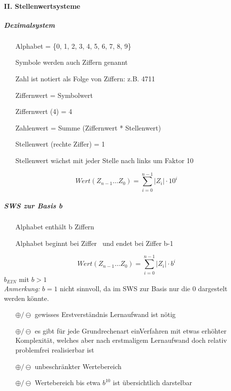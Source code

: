 \documentclass[10pt,a4paper]{scrartcl}
\begin{document}
	\paragraph{II. Stellenwertsysteme}
	\subparagraph{Dezimalsystem}
	\begin{itemize}
		\item[] Alphabet = \{0, 1, 2, 3, 4, 5, 6, 7, 8, 9\}
		\item[] Symbole werden auch Ziffern genannt
		\item[] Zahl ist notiert als Folge von Ziffern: z.B. 4711
		\item[] Ziffernwert = Symbolwert
		\item[] Ziffernwert (4) = 4
		\item[] Zahlenwert = Summe (Ziffernwert * Stellenwert) 
		\item[] Stellenwert (rechte Ziffer) = 1  
		\item[]Stellenwert wächst mit jeder Stelle nach links um Faktor 10
	\end{itemize}
	$$
	Wert(Z_{n-1} \dots Z_0) = \sum_{i=0}^{n-1}|Z_i|\cdot10^i
	$$
	\subparagraph{SWS zur Basis b}
	\begin{itemize}
		\item[] Alphabet enthält b Ziffern
		\item[] Alphabet beginnt bei Ziffer \grqq\ und endet bei Ziffer \glqq b-1\grqq\
	\end{itemize} 
	$$
		Wert(Z_{n-1} \dots Z_0) = \sum_{i=0}^{n-1}|Z_i| \cdot b^i
	$$
	$b_{EIN}$ mit $b>1$\\
	\textit{Anmerkung:} $b=1$ nicht sinnvoll, da im SWS zur Basis nur die 0 dargestelt werden könnte.
	\begin{itemize}
		\item[$ \oplus/\ominus $] gewisses \glqq Erstverständnis \grqq\/Lernaufwand ist nötig
		\item[$ \oplus/\ominus $] es gibt für jede Grundrechenart einVerfahren mit etwas erhöhter Komplexität, welches aber nach erstmaligem Lernaufwand doch relativ problemfrei realisierbar ist
		\item[$ \oplus/\ominus $] unbeschränkter Wertebereich
		\item[$ \oplus/\ominus $] Wertebereich bis etwa $b^10$ ist übersichtlich darstelbar
	\end{itemize}
\end{document}
